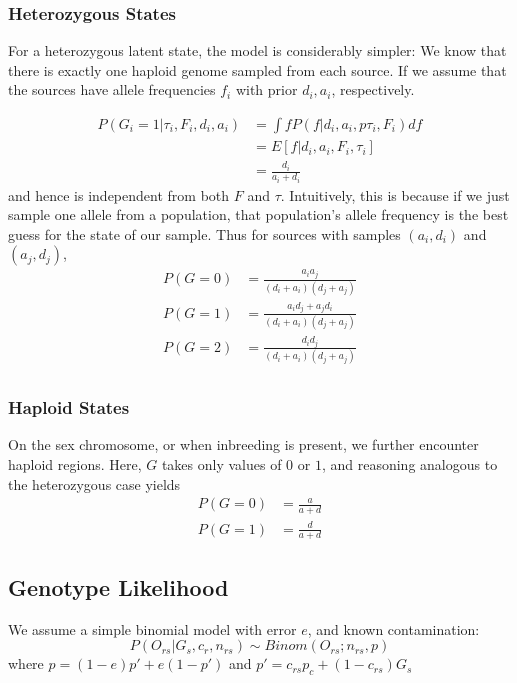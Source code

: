 \documentclass[10pt,a4paper]{article}
\begin{document}
\subsubsection{Heterozygous States}
For a heterozygous latent state, the model is considerably simpler: We know that there is exactly one haploid genome sampled from each source. If we assume that the sources have allele frequencies $f_i$ with prior $d_i, a_i$, respectively.

\begin{align}
P(G_i = 1 | \tau_i, F_i, d_i, a_i) &=  \int f P(f| d_i, a_i, p \tau_i, F_i) df\nonumber\\
&= E[f| d_i, a_i, F_i, \tau_i]\nonumber\\
&=\frac{d_i}{a_i+d_i}\label{eq:ll:het}
\end{align}
and hence is independent from both $F$ and $\tau$. Intuitively, this is because if we just sample one allele from a population, that population's allele frequency is the best guess for the state of our sample.
Thus for sources with samples $(a_i, d_i)$ and $(a_j, d_j)$, 
\begin{align*}
P(G=0) &= \frac{a_i a_j}{(d_i+a_i)(d_j+a_j)}\\
P(G=1) &= \frac{a_id_j + a_jd_i}{(d_i+a_i)(d_j+a_j)}\\
P(G=2) &= \frac{d_i d_j}{(d_i+a_i)(d_j+a_j)}\\
\end{align*}



\subsubsection{Haploid States}
On the sex chromosome, or when inbreeding is present, we further encounter haploid regions. Here, $G$ takes only values of $0$ or $1$, and reasoning analogous to the heterozygous case yields
\begin{align}
P(G=0) &= \frac{a}{a+d}\nonumber\\
P(G=1) &= \frac{d}{a+d}\label{eq:ll:hap}
\end{align}

\subsection*{Genotype Likelihood}
We assume a simple binomial model with error $e$, and known contamination:
\begin{equation}
P(O_{rs}| G_s, c_r, n_{rs}) \sim Binom(O_{rs}; n_{rs}, p) \label{eq:ll:geno}
\end{equation}
where $p = (1-e) p' + e (1-p')$
and $p' =c_{rs} p_c + (1-c_{rs}) G_s$
\end{document}
